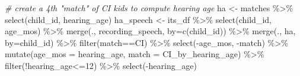 \documentclass[
]{article}
\newenvironment{Shaded}{\begin{snugshade}}{\end{snugshade}}
\newcommand{\AttributeTok}[1]{\textcolor[rgb]{0.77,0.63,0.00}{#1}}
\newcommand{\CommentTok}[1]{\textcolor[rgb]{0.56,0.35,0.01}{\textit{#1}}}
\newcommand{\DecValTok}[1]{\textcolor[rgb]{0.00,0.00,0.81}{#1}}
\newcommand{\FunctionTok}[1]{\textcolor[rgb]{0.00,0.00,0.00}{#1}}
\newcommand{\NormalTok}[1]{#1}
\newcommand{\OtherTok}[1]{\textcolor[rgb]{0.56,0.35,0.01}{#1}}
\newcommand{\SpecialCharTok}[1]{\textcolor[rgb]{0.00,0.00,0.00}{#1}}
\newcommand{\StringTok}[1]{\textcolor[rgb]{0.31,0.60,0.02}{#1}}
\begin{document}
\begin{Shaded}
\begin{Highlighting}[]
\CommentTok{\# create a 4th "match" of CI kids to compute hearing age}
\NormalTok{ha }\OtherTok{\textless{}{-}}\NormalTok{ matches }\SpecialCharTok{\%\textgreater{}\%} \FunctionTok{select}\NormalTok{(child\_id, hearing\_age)}
\NormalTok{ha\_speech }\OtherTok{\textless{}{-}}\NormalTok{ its\_df }\SpecialCharTok{\%\textgreater{}\%}
  \FunctionTok{select}\NormalTok{(child\_id, age\_mos) }\SpecialCharTok{\%\textgreater{}\%}
  \FunctionTok{merge}\NormalTok{(., recording\_speech, }\AttributeTok{by=}\FunctionTok{c}\NormalTok{(}\StringTok{\textquotesingle{}child\_id\textquotesingle{}}\NormalTok{)) }\SpecialCharTok{\%\textgreater{}\%}
  \FunctionTok{merge}\NormalTok{(., ha, }\AttributeTok{by=}\StringTok{\textquotesingle{}child\_id\textquotesingle{}}\NormalTok{) }\SpecialCharTok{\%\textgreater{}\%}
  \FunctionTok{filter}\NormalTok{(match}\SpecialCharTok{==}\StringTok{\textquotesingle{}CI\textquotesingle{}}\NormalTok{) }\SpecialCharTok{\%\textgreater{}\%}
  \FunctionTok{select}\NormalTok{(}\SpecialCharTok{{-}}\NormalTok{age\_mos, }\SpecialCharTok{{-}}\NormalTok{match) }\SpecialCharTok{\%\textgreater{}\%}
  \FunctionTok{mutate}\NormalTok{(}\AttributeTok{age\_mos =}\NormalTok{ hearing\_age,}
         \AttributeTok{match =} \StringTok{\textquotesingle{}CI\_by\_hearing\_age\textquotesingle{}}\NormalTok{) }\SpecialCharTok{\%\textgreater{}\%}
  \FunctionTok{filter}\NormalTok{(}\SpecialCharTok{!}\NormalTok{hearing\_age}\SpecialCharTok{\textless{}=}\DecValTok{12}\NormalTok{) }\SpecialCharTok{\%\textgreater{}\%}
  \FunctionTok{select}\NormalTok{(}\SpecialCharTok{{-}}\NormalTok{hearing\_age) }



\end{Highlighting}
\end{Shaded}
\end{document}
